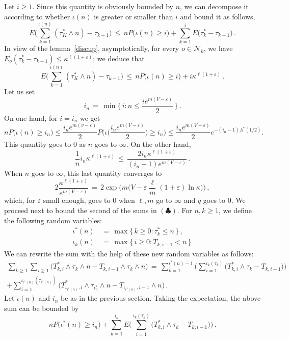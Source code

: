 \documentclass[a4paper,12pt]{article}
\theoremstyle{definition}
\theoremstyle{remark}
\def \cN {\mathcal{N}}
\def \e {\varepsilon}
\def \k {\kappa}
\def \L {\Lambda}
\begin{document}
Let $i\geq 1$.
Since this quantity is obviously bounded by $n$,
we can decompose it according to whether $\iota(n)$ is greater or smaller than $i$ and bound it as follows,
$$E\Bigg(
\sum_{k=1}^{\iota(n)}(\tau^*_K\wedge n)-\tau_{k-1}
\Bigg)\,\leq\,nP\big(
\iota(n)\geq i
\big)+\sum_{k=1}^i E\big(
\tau^*_k-\tau_{k-1}
\big)\,.$$
In view of the lemma~\ref{discup}, asymptotically,
for every $o\in\cN_k$, we have 
$E_o(\tau^*_k-\tau_{k-1})\leq \k^{\ell(1+\e)}$;
we deduce that
$$E\Bigg(
\sum_{k=1}^{\iota(n)}(\tau^*_K\wedge n)-\tau_{k-1}
\Bigg)\,\leq\,nP\big(
\iota(n)\geq i
\big)+i\k^{\ell(1+\e)}\,.$$
Let us set 
$$i_n\,=\,\min\Big\lbrace\,
i:n\leq \frac{i e^{m(V-\e)}}{2}
\,\Big\rbrace\,.$$
On one hand, for $i=i_n$ we get
$$nP\big(
\iota(n)\geq i_n
\big)\leq\frac{i_ne^{m(v-\e)}}{2}P\bigg(\!
\iota\Big(
\frac{i_n e^{m(V-\e)}}{2}
\Big)\geq i_n\!
\bigg)\!\leq\frac{i_n e^{m(V-\e)}}{2}e^{-(i_n-1)\L^*(1/2)}.$$
This quantity goes to $0$ as $n$ goes to $\infty$. 
On the other hand,
$$\frac{1}{n}i_n\k^{\ell(1+\e)}\,\leq\,
\frac{2 i_n \k^{\ell(1+\e)}}{(i_n-1)e^{m(V-\e)}}\,.$$
When $n$ goes to $\infty$,
this last quantity converges to 
$$2\frac{\k^{\ell(1+\e)}}{e^{m(V-\e)}}\,=\,2\exp\Big(
m\big(
V-\e\frac{\ell}{m}(1+\e)\ln\k
\big)
\Big)\,,$$
which, for $\e$ small enough, goes to $0$ when $\ell,m$ go to $\infty$ and $q$ goes to $0$.
We proceed next to bound the second of the sums in $(\clubsuit)$.
For $n,k\geq 1$, we define the following random variables:
\begin{align*}
\iota^*(n)\,&=\,\max\big\lbrace\,
k\geq 0: \tau^*_k\leq n
\,\big\rbrace\,,\\
\iota_k(n)\,&=\,\max\big\lbrace\,
i\geq0: T_{k,i-1}< n
\,\big\rbrace\,
\end{align*}
We can rewrite the sum with the help of these 
new random variables as follows:
\begin{multline*}
\sum_{k\geq 1}\sum_{i\geq 1}\big(
T^*_{k,i}\wedge \tau_k\wedge n-T_{k,i-1}\wedge\tau_k\wedge n
\big)\,
=\,\sum_{k=1}^{\iota^*(n)-1}\Bigg(
\sum_{i=1}^{\iota_k(\tau_k)}
\big(
T_{k,i}^*\wedge\tau_k-T_{k,i-1}
\big)
\Bigg)
\\+\sum_{i=1}^{\iota_{\iota^*(n)}(\tau_{\iota^*(n)})}
\big(
T_{\iota_{\iota^*(n)},i}^*\wedge\tau_{\iota^*_n}\wedge n-T_{\iota_{\iota^*(n)},i-1}\wedge n
\big)\,.
\end{multline*}
Let $\iota(n)$ and $i_n$ be as in the previous section.
Taking the expectation, the above sum can be bounded by
$$nP\big(
\iota^*(n)\geq i_n
\big)+\sum_{k=1}^{i_n}E\Bigg(
\sum_{i=1}^{\iota_k(\tau_k)}\big(
T^*_{k,i}\wedge \tau_k-T_{k,i-1}
\big)
\Bigg)\,.$$
\end{document}
